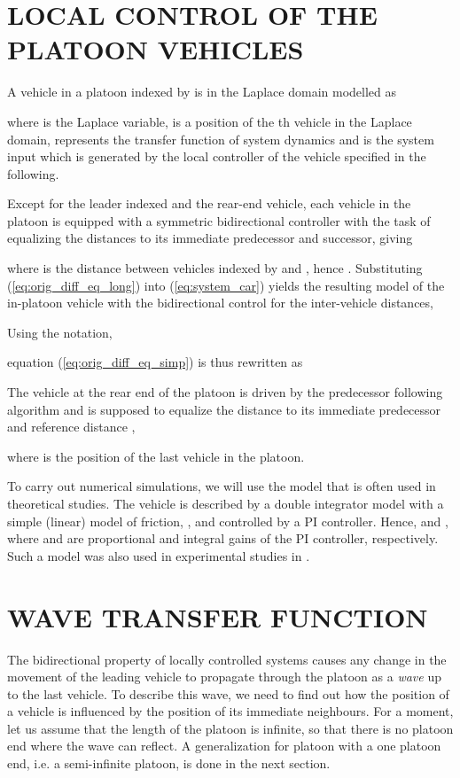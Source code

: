 \documentclass[final,5p,times,twocolumn]{elsarticle}
\begin{document}
\section{LOCAL CONTROL OF THE PLATOON VEHICLES}
A vehicle in a platoon indexed by  is in the Laplace domain modelled as

where  is the Laplace variable,  is a position of the th vehicle in the Laplace domain,  represents the transfer function of system dynamics and  is the system input which is generated by the local controller of the vehicle specified in the following.

Except for the leader indexed  and the rear-end vehicle, each vehicle in the platoon is equipped with a symmetric bidirectional controller  with the task of equalizing the distances to its immediate predecessor and successor, giving

where  is the distance between vehicles indexed by  and , hence . Substituting (\ref{eq:orig_diff_eq_long}) into (\ref{eq:system_car}) yields the resulting model of the in-platoon vehicle with the bidirectional control for the inter-vehicle distances,

Using the notation,

equation (\ref{eq:orig_diff_eq_simp}) is thus rewritten as

The vehicle at the rear end of the platoon is driven by the predecessor following algorithm and is supposed to equalize the distance to its immediate predecessor and reference distance ,

where  is the position of the last vehicle in the platoon.

To carry out numerical simulations, we will use the model that is often used in theoretical studies. The vehicle is described by a double integrator model with a simple (linear) model of friction, , and controlled by a PI controller. Hence,  and , where  and  are proportional and integral gains of the PI controller, respectively. Such a model was also used in experimental studies in \cite{Martinec2012}.

\section{WAVE TRANSFER FUNCTION}

The bidirectional property of locally controlled systems causes any change in the movement of the leading vehicle to propagate through the platoon as a \emph{wave} up to the last vehicle. To describe this wave, we need to find out how the position of a vehicle is influenced by the position of its immediate neighbours. For a moment, let us assume that the length of the platoon is infinite, so that there is no platoon end where the wave can reflect. A generalization for platoon with a one platoon end, i.e. a semi-infinite platoon, is done in the next section.
\end{document}
